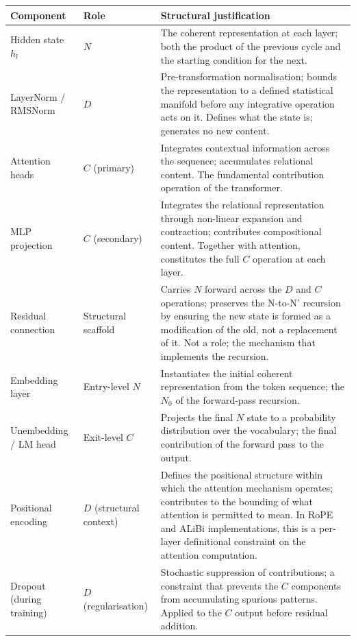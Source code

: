 \documentclass[12pt]{article}
\begin{document}
\begin{longtable}[]{@{}
  >{\raggedright\arraybackslash}p{}
  >{\raggedright\arraybackslash}p{}
  >{\raggedright\arraybackslash}p{}@{}}
\toprule\noalign{}
\begin{minipage}[b]{\linewidth}\raggedright
Component
\end{minipage} & \begin{minipage}[b]{\linewidth}\raggedright
Role
\end{minipage} & \begin{minipage}[b]{\linewidth}\raggedright
Structural justification
\end{minipage} \\
\midrule\noalign{}
\endhead
\bottomrule\noalign{}
\endlastfoot
Hidden state \(h_l\) & \(N\) & The coherent representation at each
layer; both the product of the previous cycle and the starting condition
for the next. \\
LayerNorm / RMSNorm & \(D\) & Pre-transformation normalisation; bounds
the representation to a defined statistical manifold before any
integrative operation acts on it. Defines what the state is; generates
no new content. \\
Attention heads & \(C\) (primary) & Integrates contextual information
across the sequence; accumulates relational content. The fundamental
contribution operation of the transformer. \\
MLP projection & \(C\) (secondary) & Integrates the relational
representation through non-linear expansion and contraction; contributes
compositional content. Together with attention, constitutes the full
\(C\) operation at each layer. \\
Residual connection & Structural scaffold & Carries \(N\) forward across
the \(D\) and \(C\) operations; preserves the N-to-N' recursion by
ensuring the new state is formed as a modification of the old, not a
replacement of it. Not a role; the mechanism that implements the
recursion. \\
Embedding layer & Entry-level \(N\) & Instantiates the initial coherent
representation from the token sequence; the \(N_0\) of the forward-pass
recursion. \\
Unembedding / LM head & Exit-level \(C\) & Projects the final \(N\)
state to a probability distribution over the vocabulary; the final
contribution of the forward pass to the output. \\
Positional encoding & \(D\) (structural context) & Defines the
positional structure within which the attention mechanism operates;
contributes to the bounding of what attention is permitted to mean. In
RoPE and ALiBi implementations, this is a per-layer definitional
constraint on the attention computation. \\
Dropout (during training) & \(D\) (regularisation) & Stochastic
suppression of contributions; a constraint that prevents the \(C\)
components from accumulating spurious patterns. Applied to the \(C\)
output before residual addition. \\
\end{longtable}
\end{document}
